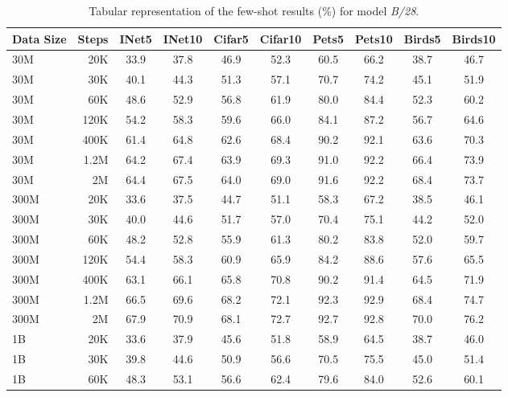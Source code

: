 \begin{table}[t]
  \setlength{\tabcolsep}{5pt}
  \setlength{\extrarowheight}{5pt}
  \renewcommand{\arraystretch}{0.75}
  \centering
  \caption{Tabular representation of the few-shot results (\%) for model \emph{B/28}.}\label{tbl:b_28}
  \begin{tabulary}{1.0\textwidth}{l r c c c c c c c c}
    \toprule[1pt]
    \bf{Data Size} & \bf{Steps} & \bf{INet5} & \bf{INet10} & \bf{Cifar5} & \bf{Cifar10} & \bf{Pets5} & \bf{Pets10} & \bf{Birds5} & \bf{Birds10} \\
    \midrule
30M   & 20K   & 33.9 & 37.8 & 46.9 & 52.3 & 60.5 & 66.2 & 38.7 & 46.7 \\
30M   & 30K   & 40.1 & 44.3 & 51.3 & 57.1 & 70.7 & 74.2 & 45.1 & 51.9 \\
30M   & 60K   & 48.6 & 52.9 & 56.8 & 61.9 & 80.0 & 84.4 & 52.3 & 60.2 \\
30M   & 120K  & 54.2 & 58.3 & 59.6 & 66.0 & 84.1 & 87.2 & 56.7 & 64.6 \\
30M   & 400K  & 61.4 & 64.8 & 62.6 & 68.4 & 90.2 & 92.1 & 63.6 & 70.3 \\
30M   & 1.2M  & 64.2 & 67.4 & 63.9 & 69.3 & 91.0 & 92.2 & 66.4 & 73.9 \\
30M   & 2M    & 64.4 & 67.5 & 64.0 & 69.0 & 91.6 & 92.2 & 68.4 & 73.7 \\
\midrule[0.25pt]
300M  & 20K   & 33.6 & 37.5 & 44.7 & 51.1 & 58.3 & 67.2 & 38.5 & 46.1 \\
300M  & 30K   & 40.0 & 44.6 & 51.7 & 57.0 & 70.4 & 75.1 & 44.2 & 52.0 \\
300M  & 60K   & 48.2 & 52.8 & 55.9 & 61.3 & 80.2 & 83.8 & 52.0 & 59.7 \\
300M  & 120K  & 54.4 & 58.3 & 60.9 & 65.9 & 84.2 & 88.6 & 57.6 & 65.5 \\
300M  & 400K  & 63.1 & 66.1 & 65.8 & 70.8 & 90.2 & 91.4 & 64.5 & 71.9 \\
300M  & 1.2M  & 66.5 & 69.6 & 68.2 & 72.1 & 92.3 & 92.9 & 68.4 & 74.7 \\
300M  & 2M    & 67.9 & 70.9 & 68.1 & 72.7 & 92.7 & 92.8 & 70.0 & 76.2 \\
\midrule[0.25pt]
1B    & 20K   & 33.6 & 37.9 & 45.6 & 51.8 & 58.9 & 64.5 & 38.7 & 46.0 \\
1B    & 30K   & 39.8 & 44.6 & 50.9 & 56.6 & 70.5 & 75.5 & 45.0 & 51.4 \\
1B    & 60K   & 48.3 & 53.1 & 56.6 & 62.4 & 79.6 & 84.0 & 52.6 & 60.1 \\

\end{tabulary}
\end{table}
